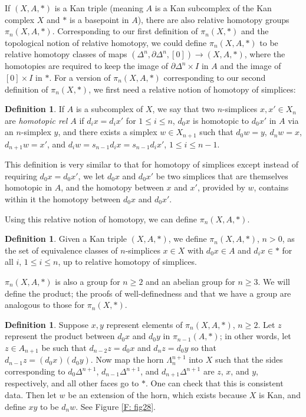 \documentclass[12pt]{article}
\theoremstyle{plain}
\theoremstyle{definition}
\newtheorem{definition}[theorem]{Definition}
\theoremstyle{remark}
\newcommand{\bd}{\partial}
\begin{document}
If $(X,A,*)$ is a Kan triple (meaning $A$ is a Kan subcomplex of the Kan complex $X$ and $*$ is a basepoint in $A$), there are also relative homotopy groups $\pi_n(X,A,*)$. Corresponding to our first definition of $\pi_n(X,*)$ and the topological notion of relative homotopy, we could define $\pi_n(X,A,*)$ to be relative homotopy classes of maps $(\Delta^n,\bd \Delta^n,[0])\to (X,A,*)$, where the homotopies are required to keep the image of $\bd \Delta^n\times I$ in $A$ and the image of $[0]\times I$ in $*$. For a  version of $\pi_n(X,A,*)$ corresponding to our second definition of $\pi_n(X,*)$, we first need a relative notion of homotopy of simplices:



\begin{definition}\label{D: rel homotopy of simplices}
If $A$ is a subcomplex of $X$, we say that two $n$-simplices $x,x'\in X_n$ are \emph{homotopic rel $A$} if $d_ix=d_ix'$ for $1\leq i\leq n$, $d_0x$ is homotopic to $d_0x'$ in $A$ via an $n$-simplex $y$, and there exists a simplex $w\in X_{n+1}$ such that $d_0w=y$, $d_nw=x$, $d_{n+1}w=x'$, and $d_iw=s_{n-1}d_ix=s_{n-1}d_ix'$, $1\leq i\leq n-1$.  
\end{definition}

This definition is very similar to that for homotopy of simplices except instead of requiring $d_0x=d_0x'$, we let $d_0x$ and $d_0x'$ be  two simplices that are themselves homotopic in $A$, and the homotopy between $x$ and $x'$, provided by $w$, contains within it the homotopy between $d_0x$ and $d_0x'$. 

Using this relative notion of homotopy, we can define $\pi_n(X,A,*)$.


\begin{definition}
Given a Kan triple $(X,A,*)$, we define $\pi_n(X,A,*)$, $n>0$, as the set of equivalence classes of $n$-simplices $x\in X$ with $d_0x\in A$ and $d_ix\in *$ for all $i$, $1\leq i\leq n$, up to relative homotopy of simplices. 
\end{definition}

$\pi_n(X,A,*)$ is also a group for $n\geq 2$ and an abelian group for $n\geq 3$. We will define the product; the proofs of well-definedness and that we have a group are analogous to those for $\pi_n(X,*)$.

\begin{definition}
Suppose $x,y$ represent elements of $\pi_n(X,A,*)$, $n\geq 2$. Let $z$ represent the product between $d_0x$ and $d_0y$ in $\pi_{n-1}(A,*)$; in other words, let $z\in A_{n+1}$ be such that $d_{n-2}z=d_0x$ and $d_{n}z=d_0y$ so that $d_{n-1}z=(d_0x)(d_0y)$. Now map the horn $\Lambda^{n+1}_n$ into $X$ such that the sides corresponding to $d_0\Delta^{n+1}$, $d_{n-1}\Delta^{n+1}$, and $d_{n+1}\Delta^{n+1}$ are $z$, $x$, and $y$, respectively, and all other faces go to $*$. One can check that this is consistent data. Then let $w$ be an extension of the horn, which exists because $X$ is Kan, and define $xy$ to be $d_nw$.  See Figure \ref{F: fig28}.
\end{definition}
\end{document}
